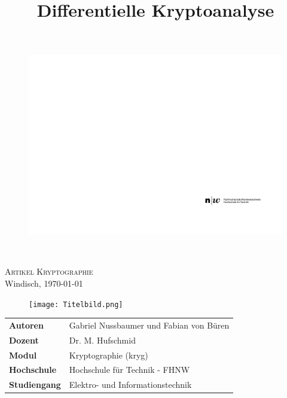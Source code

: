 \documentclass[final]{fhnwreport}       %
\title{Differentielle Kryptoanalyse}  		        %
\begin{document}
\thispagestyle{empty}
	\begin{figure}
		 \vspace*{-\topskip}\vspace*{-\headsep}
		\includegraphics[scale=1]{graphics/fhnw_ht_logo_de.pdf}
	\end{figure}

	
	\begin{center}
		\vspace*{2cm}
		{\huge{\textbf{\thetitle}}}\\
		\vspace*{0.5cm}
		
		{\scshape\Large Artikel Kryptographie \\} 
		\Large{Windisch, \today}
		
		\vspace*{-1cm}						    %
		\vfill
		\begin{figure}[H]
		\centering
		\texttt{[image: Titelbild.png]}
		\cite{thirah_vorhangeschloss-schlussel-computer-icons_nodate}
		\end{figure}
		
	
		\vfill
		
		\begin{normalsize}
			{
			\renewcommand\arraystretch{2}
			\begin{tabular}{>{\bf}p{4cm} l}
			Autoren   		           & 	Gabriel Nussbaumer und Fabian von Büren\\
			Dozent                 &    Dr. M. Hufschmid\\
			Modul		               &    Kryptographie (kryg)\\
			Hochschule                 &    Hochschule für Technik - FHNW\\
			Studiengang                &    Elektro- und Informationstechnik\\
			\end{tabular}
			}
		\end{normalsize}
	\end{center}
\clearpage
			
\end{document}
